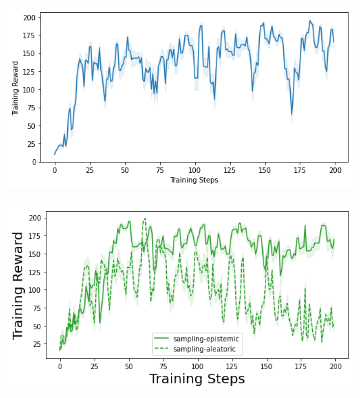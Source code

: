 \begin{figure}
    \begin{subfigure}{.245\textwidth}
        \includegraphics[width=\textwidth]{sections/011_icml2022/resources/cartpole-training_total_reward-dkl-training-strategy.png}
    \end{subfigure}
    \begin{subfigure}{.245\textwidth}
        \includegraphics[width=\textwidth]{sections/011_icml2022/resources/cartpole-training_total_reward-postnet-training-strategy.png}
    \end{subfigure}
    

\end{figure}
